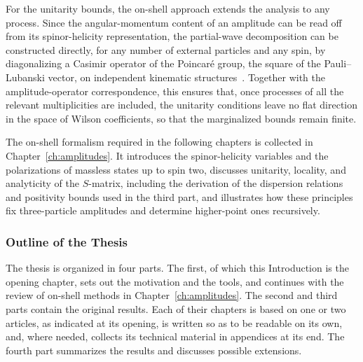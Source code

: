 For the unitarity bounds, the on-shell approach extends the analysis to any process. Since the angular-momentum
content of an amplitude can be read off from its spinor-helicity representation, the partial-wave
decomposition can be constructed directly, for any number of external particles and any spin, by
diagonalizing a Casimir operator of the Poincaré group, the square of the Pauli--Lubanski vector, on
independent kinematic structures~\cite{Jiang:2020rwz,Shu:2021qlr}. Together with the
amplitude-operator correspondence, this ensures that, once processes of all the relevant
multiplicities are included, the unitarity conditions leave no flat direction in the space of Wilson
coefficients, so that the marginalized bounds remain finite.

The on-shell formalism required in the following chapters is collected in
Chapter~\ref{ch:amplitudes}. It introduces the spinor-helicity variables and the polarizations of
massless states up to spin two, discusses unitarity, locality, and analyticity of the $S$-matrix,
including the derivation of the dispersion relations and positivity bounds used in the third part,
and illustrates how these principles fix three-particle amplitudes and determine higher-point ones
recursively. 


\subsubsection*{Outline of the Thesis}

The thesis is organized in four parts. The first, of which this Introduction is the opening chapter,
sets out the motivation and the tools, and continues with the review of on-shell methods in
Chapter~\ref{ch:amplitudes}. The second and third parts contain the original results. Each of their
chapters is based on one or two articles, as indicated at its opening, is written so as to be
readable on its own, and, where needed, collects its technical material in appendices at its end.
The fourth part summarizes the results and discusses possible extensions.

